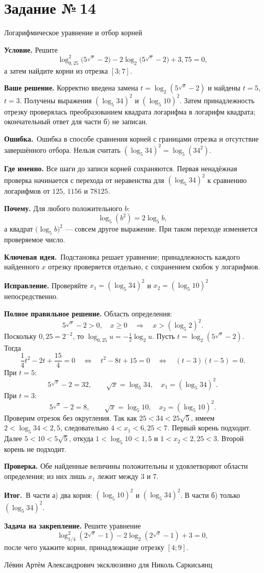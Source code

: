 \documentclass[a4paper,11pt]{article}
\newcommand{\Hdr}[1]{\par\vspace{2pt}\noindent\textbf{#1}\quad}
\newcommand{\E}{\par\smallskip\noindent\textcolor{errorred}{\textbf{Ошибка.}}\ }
\newcommand{\K}{\par\smallskip\noindent\textcolor{accent}{\textbf{Ключевая идея.}}\ }
\newcommand{\I}{\par\smallskip\noindent\textcolor{accent}{\textbf{Итог.}}\ }
\newcommand{\Task}[2]{\clearpage\phantomsection\label{task:#1}\section*{Задание №\,#1}\textcolor{accent}{#2}\par\vspace{7pt}}
\newcommand{\Footer}{\par\vfill\begin{center}\footnotesize\color{ink}Лёвин Артём Александрович эксклюзивно для Николь Саркисьянц\end{center}}
\begin{document}
\Task{14}{Логарифмическое уравнение и отбор корней}
\Hdr{Условие.} Решите
\[
\log_{0{,}25}^{2}\bigl(5^{\sqrt{x}}-2\bigr)
-2\log_2\bigl(5^{\sqrt{x}}-2\bigr)+3{,}75=0,
\]
а затем найдите корни из отрезка $[3;7]$.
\Hdr{Ваше решение.} Корректно введена замена $t=\log_2(5^{\sqrt x}-2)$ и найдены $t=5$, $t=3$. Получены выражения $(\log_5 34)^2$ и $(\log_5 10)^2$. Затем принадлежность отрезку проверялась преобразованием квадрата логарифма в логарифм квадрата; окончательный ответ для части б) не записан.
\E Ошибка в способе сравнения корней с границами отрезка и отсутствие завершённого отбора. Нельзя считать $(\log_5 34)^2=\log_5(34^2)$.
\Hdr{Где именно.} Все шаги до записи корней сохраняются. Первая ненадёжная проверка начинается с перехода от неравенства для $(\log_5 34)^2$ к сравнению логарифмов от $125$, $1156$ и $78125$.
\Hdr{Почему.} Для любого положительного $b$:
\[
\log_5(b^2)=2\log_5 b,
\]
а квадрат $\bigl(\log_5 b\bigr)^2$ --- совсем другое выражение. При таком переходе изменяется проверяемое число.
\K Подстановка решает уравнение; принадлежность каждого найденного $x$ отрезку проверяется отдельно, с сохранением скобок у логарифмов.
\Hdr{Исправление.} Проверяйте $x_1=(\log_5 34)^2$ и $x_2=(\log_5 10)^2$ непосредственно.
\Hdr{Полное правильное решение.} Область определения:
\[5^{\sqrt x}-2>0,\quad x\ge0\quad\Longrightarrow\quad x>(\log_5 2)^2.\]
Поскольку $0{,}25=2^{-2}$, то $\log_{0{,}25}u=-\frac12\log_2u$. Пусть $t=\log_2(5^{\sqrt x}-2)$. Тогда
\[
\frac14t^2-2t+\frac{15}{4}=0
\quad\Longleftrightarrow\quad t^2-8t+15=0
\quad\Longleftrightarrow\quad(t-3)(t-5)=0.
\]
При $t=5$:
\[5^{\sqrt x}-2=32,\qquad \sqrt x=\log_5 34,\quad x_1=(\log_5 34)^2.\]
При $t=3$:
\[5^{\sqrt x}-2=8,\qquad \sqrt x=\log_5 10,\quad x_2=(\log_5 10)^2.\]
Проверим отрезок без округления. Так как $25<34<25\sqrt5$, имеем $2<\log_5 34<2{,}5$, следовательно $4<x_1<6{,}25<7$. Первый корень подходит. Далее $5<10<5\sqrt5$, откуда $1<\log_5 10<1{,}5$ и $1<x_2<2{,}25<3$. Второй корень не подходит.
\Hdr{Проверка.} Обе найденные величины положительны и удовлетворяют области определения; из них лишь $x_1$ лежит между $3$ и $7$.
\I В части а) два корня: $(\log_5 10)^2$ и $(\log_5 34)^2$. В части б) только $\boxed{(\log_5 34)^2}$.
\Hdr{Задача на закрепление.} Решите уравнение
\[
\log_{1/4}^{2}(2^{\sqrt{x}}-1)-2\log_2(2^{\sqrt{x}}-1)+3=0,
\]
после чего укажите корни, принадлежащие отрезку $[4;9]$.
\Footer
\end{document}
